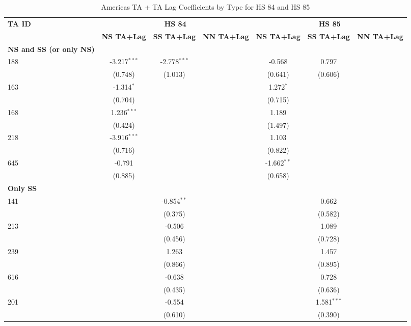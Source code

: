 \begin{table}[htbp]
    \centering
    \caption{Americas TA + TA Lag Coefficients by Type for HS 84 and HS 85}
    \label{tab:epuv_americas_pta}
    \begin{adjustbox}{max width=\textwidth}
    \begin{tabular}{lcccccc}
    \hline
    \textbf{TA ID} & \multicolumn{3}{c}{\textbf{HS 84}} & \multicolumn{3}{c}{\textbf{HS 85}} \\
    & \textbf{NS TA+Lag} & \textbf{SS TA+Lag} & \textbf{NN TA+Lag} & \textbf{NS TA+Lag} & \textbf{SS TA+Lag} & \textbf{NN TA+Lag} \\
    \hline
    \textbf{NS and SS (or only NS)} &  &  &  &  &  &  \\
    \hline
    188 & -3.217$^{\ast\ast\ast}$ & -2.778$^{\ast\ast\ast}$ &  & -0.568 & 0.797 &  \\
    & (0.748) & (1.013) &  & (0.641) & (0.606) &  \\
    163 & -1.314$^{\ast}$ &  &  & 1.272$^{\ast}$ &  &  \\
     & (0.704) &  &  & (0.715) &  &  \\
    168 & 1.236$^{\ast\ast\ast}$ &  &  & 1.189 &  &  \\
     & (0.424) &  &  & (1.497) &  &  \\
    218 & -3.916$^{\ast\ast\ast}$ &  &  & 1.103 &  &  \\
     & (0.716) &  &  & (0.822) &  &  \\
    645 & -0.791 &  &  & -1.662$^{\ast\ast}$ &  &  \\
     & (0.885) &  &  & (0.658) &  &  \\
    \hline
    \textbf{Only SS} &  &  &  &  &  &  \\
    \hline
    141 &  & -0.854$^{\ast\ast}$ &  &  & 0.662 &  \\
     &  & (0.375) &  &  & (0.582) &  \\
    213 &  & -0.506 &  &  & 1.089 &  \\
     &  & (0.456) &  &  & (0.728) &  \\
    239 &  & 1.263 &  &  & 1.457 &  \\
     &  & (0.866) &  &  & (0.895) &  \\
    616 &  & -0.638 &  &  & 0.728 &  \\
     &  & (0.435) &  &  & (0.636) &  \\
    201 &  & -0.554 &  &  & 1.581$^{\ast\ast\ast}$ &  \\
     &  & (0.610) &  &  & (0.390) &  \\

\end{tabular}
\end{adjustbox}
\end{table}
